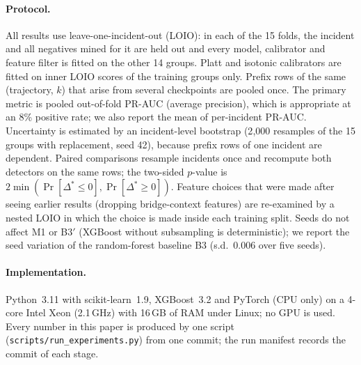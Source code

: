 \paragraph{Protocol.}
All results use leave-one-incident-out (LOIO): in each of the 15 folds, the incident and all negatives mined for it are held out and every model, calibrator and feature filter is fitted on the other 14 groups.
Platt and isotonic calibrators are fitted on inner LOIO scores of the training groups only.
Prefix rows of the same (trajectory, $k$) that arise from several checkpoints are pooled once.
The primary metric is pooled out-of-fold PR-AUC (average precision), which is appropriate at an 8\% positive rate; we also report the mean of per-incident PR-AUC.
Uncertainty is estimated by an incident-level bootstrap (2{,}000 resamples of the 15 groups with replacement, seed 42), because prefix rows of one incident are dependent.
Paired comparisons resample incidents once and recompute both detectors on the same rows; the two-sided $p$-value is $2\min(\Pr[\Delta^*\le0],\Pr[\Delta^*\ge0])$.
Feature choices that were made after seeing earlier results (dropping bridge-context features) are re-examined by a nested LOIO in which the choice is made inside each training split.
Seeds do not affect M1 or B3$'$ (XGBoost without subsampling is deterministic); we report the seed variation of the random-forest baseline B3 (s.d.\ 0.006 over five seeds).

\paragraph{Implementation.}
Python~3.11 with scikit-learn~1.9, XGBoost~3.2 and PyTorch (CPU only) on a 4-core Intel Xeon (2.1\,GHz) with 16\,GB of RAM under Linux; no GPU is used.
Every number in this paper is produced by one script (\texttt{scripts/run\_experiments.py}) from one commit; the run manifest records the commit of each stage.
